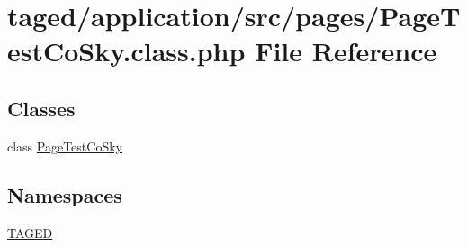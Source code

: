 \hypertarget{_page_test_co_sky_8class_8php}{}\section{taged/application/src/pages/\+Page\+Test\+Co\+Sky.class.\+php File Reference}
\label{_page_test_co_sky_8class_8php}
\subsection*{Classes}
\begin{DoxyCompactItemize}
\item 
class \hyperlink{class_page_test_co_sky}{Page\+Test\+Co\+Sky}
\end{DoxyCompactItemize}
\subsection*{Namespaces}
\begin{DoxyCompactItemize}
\item 
 \hyperlink{namespace_t_a_g_e_d}{T\+A\+G\+ED}
\end{DoxyCompactItemize}
